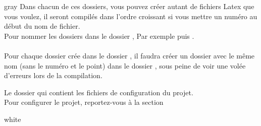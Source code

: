 {\begin{items}{gray}{\faFolder}
    Dans chacun de ces dossiers, vous pouvez créer autant de fichiers Latex que vous voulez, il seront compilés dans 
    l'ordre croissant si vous mettre un numéro au début du nom de fichier.\\

    Pour nommer les dossiers dans le dossier ,  Par exemple  puis .\\
    \\

    Pour chaque dossier crée dans le dossier , il faudra créer un dossier avec le même nom (sans le numéro et le point) dans le dossier 
    , sous peine de voir une volée d'erreurs lors de la compilation.\\

    \item Le dossier  qui contient les fichiers de configuration du projet.\\
    Pour configurer le projet, reportez-vous à la section 

    \begin{items}{white}{}


\end{items}
\end{items}}

